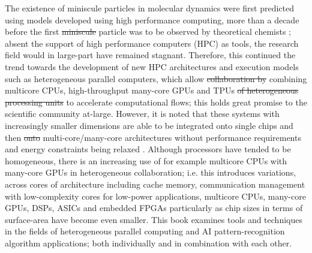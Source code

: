 \documentclass[10pt]{article}[draft]
\begin{document}
The existence of miniscule particles in molecular dynamics were first predicted using models developed using high performance computing, more than a decade before the first \st{miniscule} particle was to be observed  by theoretical chemists \cite{nobelchemistry2013}; absent the support of high performance computers (HPC) as  tools, the research field would in large-part have remained stagnant. Therefore, this continued the trend towards the development of new HPC architectures and execution models such as heterogeneous parallel computers, which allow \st{collaboration by} combining multicore CPUs,  high-throughput many-core GPUs and TPUs \st{of heterogeneous processing units} to accelerate computational flows; this holds great promise to the scientific community at-large. However, it is noted that  these systems with increasingly smaller dimensions are able to be integrated onto single chips and then \st{onto} multi-core/many-core architectures without  performance requirements and energy constraints being relaxed \cite{borkar2007thousand}. Although processors have tended to be homogeneous, there is an increasing use of for example multicore CPUs with many-core GPUs in heterogeneous collaboration; i.e. this introduces variations, across cores of architecture including cache memory, communication management with low-complexity cores for low-power applications, multicore CPUs, many-core GPUs, DSPs, ASICs and embedded FPGAs particularly as chip sizes in terms of surface-area have become even smaller.  This book examines tools and techniques in the fields of heterogeneous parallel computing and AI pattern-recognition algorithm applications; both individually and  in combination with each other.
\vspace{0.25in}
\end{document}
